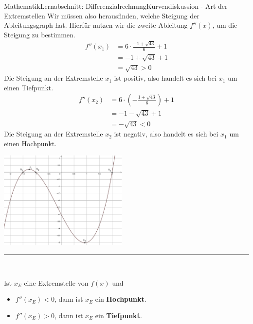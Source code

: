 \documentclass[11pt,twocolumn,oneside,openany,headings=optiontotoc,11pt,numbers=noenddot]{article}
\begin{document}
\begin{worksheet}{Mathematik}{Lernabschnitt: Differenzialrechnung}{Kurvendiskussion - Art der Extremstellen}
		Wir müssen also herausfinden, welche Steigung der Ableitungsgraph hat. Hierfür nutzen wir die zweite Ableitung \(f''(x)\), um die Steigung zu bestimmen.\\
		\begin{align*}
			f''(x_1) & = 6\cdot{}\frac{-1+\sqrt{43}}{6} + 1\\
			& = -1+\sqrt{43} + 1\\
			& = \sqrt{43} > 0
		\end{align*}
		Die Steigung an der Extremstelle \(x_1\) ist positiv, also handelt es sich bei \(x_1\) um einen Tiefpunkt.
		\begin{align*}
			f''(x_2) & = 6\cdot{}\left(-\frac{1+\sqrt{43}}{6}\right) + 1\\
			& = - 1 - \sqrt{43} + 1\\
			& = -\sqrt{43} < 0
		\end{align*}
		Die Steigung an der Extremstelle \(x_2\) ist negativ, also handelt es sich bei \(x_1\) um einen Hochpunkt.\\
		\par\noindent
		\includegraphics[width=0.48\textwidth]{../99_Bilder/042_Bsp.png}\\
		\rule{0.48\textwidth}{0.1pt}\\
		\par\noindent
		Ist \(x_E\) eine Extremstelle von \(f(x)\) und
		\begin{itemize}[label=-]
			\item \(f''(x_E) < 0\), dann ist \(x_E\) ein \textbf{Hochpunkt}.\\
			\item \(f''(x_E) > 0\), dann ist \(x_E\) ein \textbf{Tiefpunkt}.
		\end{itemize}
	\end{worksheet}
\end{document}
